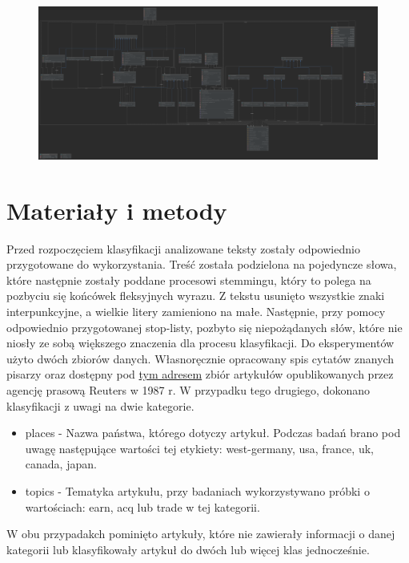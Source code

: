 \documentclass{classrep}
\begin{document}
\begin{center}
	\begin{figure}[H]
		\advance\leftskip-3.65cm
		\includegraphics[width=\paperwidth]{ksr_uml}
	\end{figure}
\end{center}


\section{Materiały i metody}
Przed rozpoczęciem klasyfikacji analizowane teksty zostały odpowiednio przygotowane do wykorzystania. Treść została podzielona na pojedyncze słowa, które następnie zostały poddane procesowi stemmingu, który to polega na pozbyciu się końcówek fleksyjnych wyrazu. Z tekstu usunięto wszystkie znaki interpunkcyjne, a wielkie litery zamieniono na małe. Następnie, przy pomocy odpowiednio przygotowanej stop-listy, pozbyto się niepożądanych słów, które nie niosły ze sobą większego znaczenia dla procesu klasyfikacji.
Do eksperymentów użyto dwóch zbiorów danych. Własnoręcznie opracowany spis cytatów znanych pisarzy oraz dostępny pod \href{http://archive.ics.uci.edu/ml/datasets/Reuters-21578+Text+Categorization+Collection}{tym adresem} zbiór artykułów opublikowanych przez agencję prasową Reuters w 1987 r. W przypadku tego drugiego, dokonano klasyfikacji z uwagi na dwie kategorie.
\begin{itemize}
	\item places - Nazwa państwa, którego dotyczy artykuł. Podczas badań brano pod uwagę następujące wartości tej etykiety: west-germany, usa, france, uk, canada, japan.
	\item topics - Tematyka artykułu, przy badaniach wykorzystywano próbki o wartościach: earn, acq lub trade w tej kategorii.
\end{itemize}
W obu przypadakch pominięto artykuły, które nie zawierały informacji o danej kategorii lub klasyfikowały artykuł do dwóch lub więcej klas jednocześnie.
\end{document}
